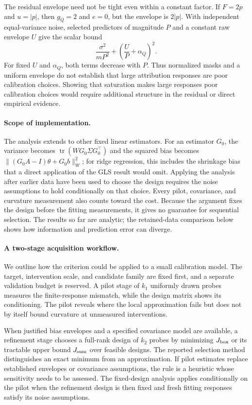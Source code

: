 The residual envelope need not be tight even within a constant factor. If
$F=2p$ and $u=|p|$, then $g_Q=2$ and $e=0$, but the envelope is $2|p|$.
With independent equal-variance noise, selected predictors of magnitude $P$
and a constant raw envelope $U$ give the scalar bound
\begin{equation}
 \frac{\sigma^2}{mP^2}+\left(\frac{U}{P}+\alpha_Q\right)^2.
\end{equation}
For fixed $U$ and $\alpha_Q$, both terms decrease with $P$. Thus normalized
masks and a uniform envelope do not establish that large attribution responses
are poor calibration choices. Showing that saturation
makes large responses poor calibration choices would require additional
structure in the residual or direct empirical evidence.

\paragraph{Scope of implementation.}
The analysis extends to other fixed linear estimators. For an estimator
$G_0$, the variance becomes $\operatorname{tr}(WG_0\Sigma G_0^\top)$ and the
squared bias becomes $\|(G_0A-I)\theta+G_0b\|_W^2$; for ridge regression,
this includes the shrinkage bias that a direct application of the GLS result
would omit. Applying the analysis after earlier data have been used to choose
the design requires the noise assumptions to hold conditionally on that choice.
Every pilot, covariance, and curvature measurement also counts toward the cost.
Because the argument fixes the design before the fitting measurements, it
gives no guarantee for sequential selection. The results so far are analytic;
the retained-data comparison below shows how information and prediction
error can diverge.

\paragraph{A two-stage acquisition workflow.}\label{par:bd-workflow}
We outline how the criterion could be applied to a small calibration model.
The target, intervention scale, and candidate family are fixed first, and a
separate validation budget is reserved. A pilot stage of $k_1$ uniformly drawn
probes measures the finite-response mismatch, while the design matrix shows
its conditioning. The pilot reveals where the local approximation fails but
does not by itself bound curvature at unmeasured interventions.

When justified bias envelopes and a specified covariance model are available,
a refinement stage chooses a full-rank design of $k_2$ probes by minimizing
$J_{\rm box}$ or its tractable upper bound $J_{\rm sum}$ over feasible designs.
The reported selection method distinguishes an exact minimum from an
approximation. If pilot estimates replace established envelopes or covariance
assumptions, the rule is a heuristic whose sensitivity needs to be assessed.
The fixed-design analysis applies conditionally on the pilot when the
refinement design is then fixed and fresh fitting responses satisfy its
noise assumptions.

